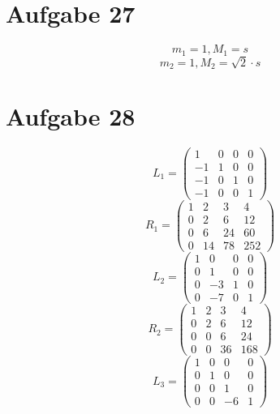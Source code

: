 \documentclass[10pt,a4paper]{article}
\begin{document}
\section{Aufgabe 27}

\begin{equation}
  m_{1} = 1, M_{1} = s
\end{equation}
\begin{equation}
  m_{2} = 1, M_{2} = \sqrt{2} \cdot s
\end{equation}

\section{Aufgabe 28}

\begin{equation}
  L_{1} = \begin{pmatrix}
    1 & 0 & 0 & 0\\
    -1 & 1 & 0 & 0\\
    -1 & 0 & 1 & 0\\
    -1 & 0 & 0 & 1
  \end{pmatrix}
\end{equation}
\begin{equation}
  R_{1} = \begin{pmatrix}
    1 & 2 & 3 & 4\\
    0 & 2 & 6 & 12\\
    0 & 6 & 24 & 60\\
    0 & 14 & 78 & 252
  \end{pmatrix}
\end{equation}
\begin{equation}
  L_{2} = \begin{pmatrix}
    1 & 0 & 0 & 0\\
    0 & 1 & 0 & 0\\
    0 & -3 & 1 & 0\\
    0 & -7 & 0 & 1
  \end{pmatrix}
\end{equation}
\begin{equation}
  R_{2} = \begin{pmatrix}
    1 & 2 & 3 & 4\\
    0 & 2 & 6 & 12\\
    0 & 0 & 6 & 24\\
    0 & 0 & 36 & 168
  \end{pmatrix}
\end{equation}
\begin{equation}
  L_{3} = \begin{pmatrix}
    1 & 0 & 0 & 0\\
    0 & 1 & 0 & 0\\
    0 & 0 & 1 & 0\\
    0 & 0 & -6 & 1
  \end{pmatrix}
\end{equation}
\end{document}
